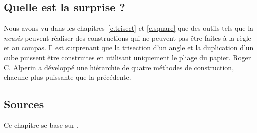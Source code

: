 \subsection*{Quelle est la surprise ?}

Nous avons vu dans les chapitres~\ref{c.trisect} et 
 \ref{c.square} que des outils tels que la \emph{neusis} peuvent réaliser des constructions qui ne peuvent pas être faites à la  règle et au compas. Il est surprenant que la trisection d'un angle et la duplication d'un cube puissent être construites en utilisant uniquement le pliage du papier. Roger C. Alperin a développé une hiérarchie de quatre méthodes de construction, chacune plus puissante que la précédente.

\subsection*{Sources}

Ce chapitre se base sur \cite{alperin,lang,martin,newton}.
